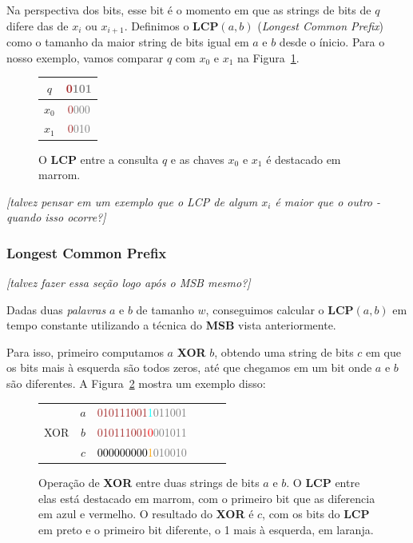 Na perspectiva dos bits, esse bit é o momento em que as strings de bits de $q$
difere das de $x_i$ ou $x_{i+1}$. Definimos o \textbf{LCP}$(a,b)$
(\textit{Longest Common Prefix}) como o tamanho da maior string de bits igual em
$a$ e $b$ desde o ínicio. Para o nosso exemplo, vamos comparar $q$ com $x_0$ e
$x_{1}$ na Figura~\ref{f:fusion-lcp-query-keys}.

\begin{figure}[!hbtp]
\centering
{
\bfseries\Large
\begin{tabular}{cc}
$q$ &
\textcolor{Brown}{0}\textcolor{Gray}{101} \\
\hline
$x_0$ &
\textcolor{Brown}{0}\textcolor{Gray}{000}  \\
$x_1$ &
\textcolor{Brown}{0}\textcolor{gray}{010}
\end{tabular}
} \caption{O \textbf{LCP} entre a consulta $q$ e as chaves $x_0$ e $x_1$ é
destacado em marrom.\label{f:fusion-lcp-query-keys}} 
\end{figure}

\textit{[talvez pensar em um exemplo que o LCP de algum $x_i$ é maior que o outro - quando isso ocorre?]}

\subsubsection{Longest Common Prefix}

\textit{[talvez fazer essa seção logo após o MSB mesmo?]}

Dadas duas \textit{palavras} $a$ e $b$ de tamanho $w$, conseguimos calcular o
\textbf{LCP}$(a,b)$ em tempo constante utilizando a técnica do \textbf{MSB}
vista anteriormente.

Para isso, primeiro computamos $a$ \textbf{XOR} $b$, obtendo uma string de bits
$c$ em que os bits mais à esquerda são todos zeros, até que chegamos em um bit
onde $a$ e $b$ são diferentes. A Figura~\ref{f:fusion-lcp-xor} mostra um exemplo
disso:

\begin{figure}[h]
\centering
{
\bfseries\Large
\begin{tabular}{cccccc}
& $a$ &
\textcolor{Brown}{010111001}\textcolor{Cyan}{1}\textcolor{Gray}{011001} \\
XOR & $b$ &
\textcolor{Brown}{010111001}\textcolor{Red}{0}\textcolor{Gray}{001011}  \\
      \hline
& $c$ &
\textcolor{black}{000000000}\textcolor{Orange}{1}\textcolor{gray}{010010}
\end{tabular}
} \caption{Operação de \textbf{XOR} entre duas strings de bits $a$ e $b$. O
\textbf{LCP} entre elas está destacado em marrom, com o primeiro bit que as
diferencia em azul e vermelho. O resultado do \textbf{XOR} é $c$, com os bits do
\textbf{LCP} em preto e o primeiro bit diferente, o 1 mais à esquerda, em
laranja.\label{f:fusion-lcp-xor}}
\end{figure}

